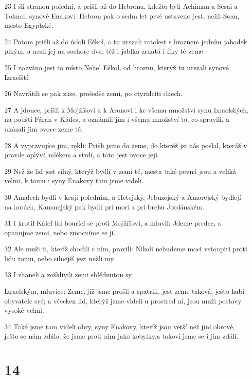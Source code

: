 \par 23 I šli stranou polední, a prišli až do Hebronu, kdežto byli Achiman a Sesai a Tolmai, synové Enakovi. Hebron pak o sedm let prvé ustaveno jest, nežli Soan, mesto Egyptské.
\par 24 Potom prišli až do údolí Eškol, a tu urezali ratolest s hroznem jedním jahodek plným, a nesli jej na sochore dva; též i jablka zrnatá i fíky té zeme.
\par 25 I nazváno jest to místo Nehel Eškol, od hroznu, kterýž tu urezali synové Izraelští.
\par 26 Navrátili se pak zase, prošedše zemi, po ctyridcíti dnech.
\par 27 A jdouce, prišli k Mojžíšovi a k Aronovi i ke všemu množství synu Izraelských, na poušti Fáran v Kádes, a oznámili jim i všemu množství to, co spravili, a ukázali jim ovoce zeme té.
\par 28 A vypravujíce jim, rekli: Prišli jsme do zeme, do kteréž jsi nás poslal, kteráž v pravde oplývá mlékem a strdí, a toto jest ovoce její.
\par 29 Než že lid jest silný, kterýž bydlí v zemi té, mesta také pevná jsou a veliká velmi, k tomu i syny Enakovy tam jsme videli.
\par 30 Amalech bydlí v kraji poledním, a Hetejský, Jebuzejský a Amorejský bydlejí na horách, Kananejský pak bydlí pri mori a pri brehu Jordánském.
\par 31 I krotil Kálef lid bourící se proti Mojžíšovi, a mluvil: Jdeme predce, a opanujme zemi, nebo zmocníme se jí.
\par 32 Ale muži ti, kteríž chodili s ním, pravili: Nikoli nebudeme moci vstoupiti proti lidu tomu, nebo silnejší jest nežli my.
\par 33 I zhaneli a zošklivili zemi shlédnutou sy\par Izraelským, mluvíce: Zeme, již jsme prošli a spatrili, jest zeme taková, ješto hubí obyvatele své; a všecken lid, kterýž jsme videli u prostred ní, jsou muži postavy vysoké velmi.
\par 34 Také jsme tam videli obry, syny Enakovy, kteríž jsou vetší než jiní obrové, ješto se nám zdálo, že jsme proti nim jako kobylky,a takoví jsme se i jim zdáli.

\chapter{14}

